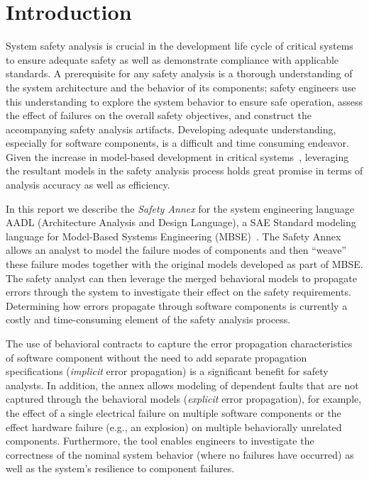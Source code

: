 \chapter{Introduction}
\label{chap:intro}

System safety analysis is crucial in the development life cycle of critical systems to ensure adequate safety as well as demonstrate compliance with applicable standards. A prerequisite for any safety analysis is a thorough understanding of the system architecture and the behavior of its components; safety engineers use this understanding to explore the system behavior to ensure safe operation, assess the effect of failures on the overall safety objectives, and construct the accompanying safety analysis artifacts. Developing adequate understanding, especially for software components, is a difficult and time consuming endeavor. Given the increase in model-based development in critical systems~\cite{Joshi05:Dasc,CAV2015:BoCiGrMa,info17:HaLuHo,5979344,Gudemann:2010:FQQ:1909626.1909813}, leveraging the resultant models in the safety analysis process holds great promise in terms of analysis accuracy as well as efficiency.

In this report we describe the \emph{Safety Annex} for the system engineering language AADL (Architecture Analysis and Design Language), a SAE Standard modeling language for Model-Based Systems Engineering (MBSE)~\cite{AADL_Standard}. The Safety Annex allows an analyst to model the failure modes of components and then ``weave'' these failure modes together with the original models developed as part of MBSE. The safety analyst can then leverage the merged behavioral models to propagate errors through the system to investigate their effect on the safety requirements. Determining how errors propagate through software components is currently a costly and time-consuming element of the safety analysis process. 

The use of behavioral contracts to capture the error propagation characteristics of software component without the need to add separate propagation specifications (\emph{implicit} error propagation) is a significant benefit for safety analysts.  
In addition, the annex allows modeling of dependent faults that are not captured through the behavioral models (\emph{explicit} error propagation), for example, the effect of a single electrical failure on multiple software components or the effect hardware failure (e.g., an explosion) on multiple behaviorally unrelated components. Furthermore, the tool enables engineers to investigate the correctness of the nominal system behavior (where no failures have occurred) as well as the system's resilience to component failures. 

